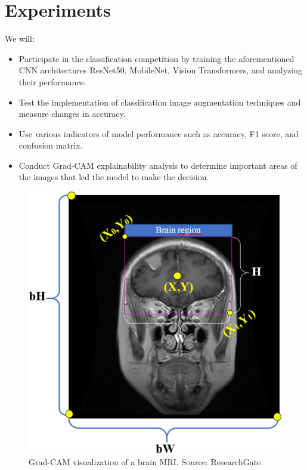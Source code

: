 \documentclass[10pt,twocolumn,letterpaper]{article}
\begin{document}
\section{Experiments}
We will:
\begin{itemize}
    \item Participate in the classification competition by training the aforementioned CNN architectures ResNet50, MobileNet, Vision Transformers, and analyzing their performance.
    \item Test the implementation of classification image augmentation techniques and measure changes in accuracy.
    \item Use various indicators of model performance such as accuracy, F1 score, and confusion matrix.
    \item Conduct Grad-CAM explainability analysis to determine important areas of the images that led the model to make the decision.
\end{itemize}

\begin{figure}[H]
    \centering
    \includegraphics[width=0.9\linewidth]{Coordinate-information-calculated-on-the-labeled-brain-image.png}
    \captionsetup{aboveskip=2pt, belowskip=2pt} %
    \caption{Grad-CAM visualization of a brain MRI. Source: ResearchGate.}
    \label{fig:grad_cam_example}
\end{figure}
\end{document}
